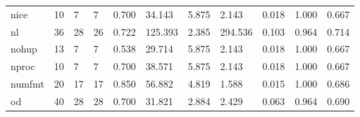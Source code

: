 \begin{longtable}{lp{1.8cm}p{1.8cm}p{1.8cm}p{1.8cm}p{1.8cm}p{1.8cm}p{1.8cm}p{1.8cm}p{1.8cm}p{1.8cm}}
nice      &                           10 &                  7 &                                 7 &                                      0.700 &                                 34.143 &                                        5.875 &                             2.143 &                                   0.018 &                              1.000 &                                              0.667 \\
nl        &                           36 &                 28 &                                26 &                                      0.722 &                                125.393 &                                        2.385 &                           294.536 &                                   0.103 &                              0.964 &                                              0.714 \\
nohup     &                           13 &                  7 &                                 7 &                                      0.538 &                                 29.714 &                                        5.875 &                             2.143 &                                   0.018 &                              1.000 &                                              0.667 \\
nproc     &                           10 &                  7 &                                 7 &                                      0.700 &                                 38.571 &                                        5.875 &                             2.143 &                                   0.018 &                              1.000 &                                              0.667 \\
numfmt    &                           20 &                 17 &                                17 &                                      0.850 &                                 56.882 &                                        4.819 &                             1.588 &                                   0.015 &                              1.000 &                                              0.686 \\
od        &                           40 &                 28 &                                28 &                                      0.700 &                                 31.821 &                                        2.884 &                             2.429 &                                   0.063 &                              0.964 &                                              0.690 \\

\end{longtable}
